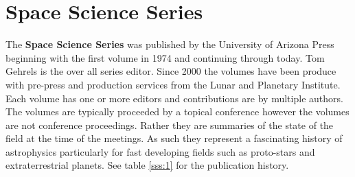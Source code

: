 
\section{Space Science Series}

The {\bf Space Science Series} was published by the University of
Arizona Press beginning with the first volume in 1974 and continuing
through today.  Tom Gehrels is the over all series editor. Since 2000
the volumes have been produce with pre-press and production services
from the Lunar and Planetary Institute. Each volume
has one or more editors and contributions are by multiple authors. The
volumes are typically proceeded by a topical conference however the
volumes are not conference proceedings. Rather they are summaries of
the state of the field at the time of the meetings.  As such they
represent a fascinating history of astrophysics particularly for fast
developing fields such as proto-stars and extraterrestrial
planets. See table \ref{sss:1} for the publication history.


